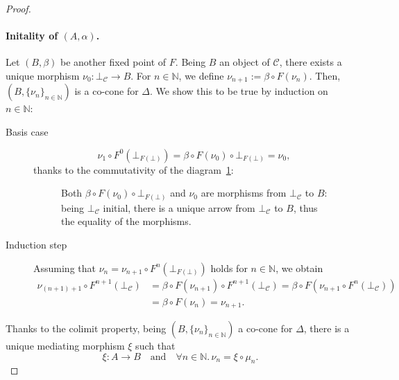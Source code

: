 \begin{proof}
  \paragraph{Initality of \((A,\alpha)\).} Let \((B,\beta)\) be another fixed point of \(F\).
  Being \(B\) an object of \(\mathcal{C}\), there exists a unique morphism \(\nu_0 \colon \bot_{\mathcal{C}} \to B\).
  For \(n \in \mathbb{N}\), we define \(\nu_{n+1} := \beta \circ F(\nu_n)\).
  Then, \((B,\lbrace \nu_n \rbrace_{n \in \mathbb{N}})\) is a co-cone for \(\Delta\). We show this to be true by induction on \(n \in \mathbb{N}\):
  \begin{description}
    \item[Basis case]
    \begin{equation}
      \nu_1 \circ F^0(\bot_{F(\bot)}) = \beta \circ F(\nu_0) \circ \bot_{F(\bot)} = \nu_0,
    \end{equation}
    thanks to the commutativity of the diagram~\ref{02:diagram-2}:
    \begin{figure}[!ht]
      \begin{center}
      \end{center}
      \caption{Both \(\beta \circ F(\nu_0) \circ \bot_{F(\bot)}\) and \(\nu_0\) are morphisms from \(\bot_{\mathcal{C}}\) to \(B\): being \(\bot_{\mathcal{C}}\) initial, there is a unique arrow from \(\bot_{\mathcal{C}}\) to \(B\), thus the equality of the morphisms.}
      \label{02:diagram-2}
    \end{figure}
    \item[Induction step] Assuming that \(\nu_n = \nu_{n+1} \circ F^n(\bot_{F(\bot)})\) holds for \(n \in \mathbb{N}\), we obtain
    \begin{equation*}
      \begin{split}
        \nu_{(n+1)+1} \circ F^{n+1}(\bot_{\mathcal{C}}) &=
        \beta \circ F(\nu_{n+1}) \circ F^{n+1}(\bot_{\mathcal{C}})
        = \beta \circ F(\nu_{n+1} \circ F^n(\bot_{\mathcal{C}})) \\
        &= \beta \circ F(\nu_n) = \nu_{n+1}.
      \end{split}
    \end{equation*}
  \end{description}
  Thanks to the colimit property, being \((B,\lbrace \nu_n \rbrace_{n \in \mathbb{N}})\) a co-cone for \(\Delta\), there is a unique mediating morphism \(\xi\) such that
  \begin{equation*}
    \xi \colon A \to B \quad\text{and}\quad \forall n \in \mathbb{N}.\, \nu_n = \xi \circ \mu_n.
  \end{equation*}
  

\end{proof}
